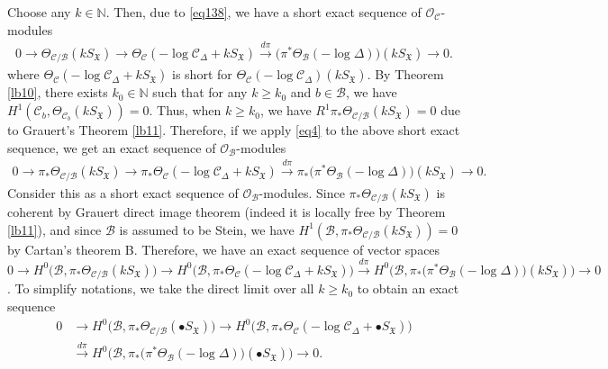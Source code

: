 \documentclass[12pt,b5paper,notitlepage]{report}
\theoremstyle{definition}
\theoremstyle{plain}
\newcommand{\fk}{\mathfrak}
\newcommand{\mc}{\mathcal}
\newcommand{\scr}{\mathscr}
\newcommand{\blt}{\bullet}
\newcommand{\Nbb}{\mathbb N}
\numberwithin{equation}{section}
\begin{document}
Choose any $k\in\Nbb$. Then, due to \eqref{eq138}, we have a short exact sequence of $\scr O_{\mc C}$-modules
\begin{align*}
0\rightarrow \Theta_{\mc C/\mc B}(kS_{\fk X})\rightarrow \Theta_{\mc C}(-\log \mc C_\Delta+kS_{\fk X})\xrightarrow{d\pi}\big(\pi^*\Theta_{\mc B}(-\log \Delta)\big)(kS_{\fk X})\rightarrow 0.
\end{align*}
where $\Theta_{\mc C}(-\log \mc C_\Delta+kS_{\fk X})$ is short for $\Theta_{\mc C}(-\log \mc C_\Delta)(kS_{\fk X})$. By Theorem \ref{lb10}, there exists $k_0\in\Nbb$ such that for any $k\geq k_0$ and $b\in \mc B$, we have $H^1(\mc C_b,\Theta_{\mc C_b}(kS_{\fk X}))=0$. Thus, when $k\geq k_0$, we have $R^1\pi_*\Theta_{\mc C/\mc B}(kS_{\fk X})=0$ due to Grauert's
Theorem \ref{lb11}. Therefore, if we apply \eqref{eq4} to the above short exact sequence, we get an exact sequence of $\scr O_{\mc B}$-modules
\begin{align*}
0\rightarrow \pi_*\Theta_{\mc C/\mc B}(k S_{\fk X})\rightarrow \pi_*\Theta_{\mc C}(-\log \mc C_\Delta+k S_{\fk X})\xrightarrow{d\pi}\pi_*\big(\pi^*\Theta_{\mc B}(-\log \Delta)\big)(k S_{\fk X})
\rightarrow 0.
\end{align*}
Consider this as a short exact sequence of $\scr O_{\mc B}$-modules. Since $\pi_*\Theta_{\mc C/\mc B}(k S_{\fk X})$ is coherent by Grauert direct image theorem (indeed it is locally free by Theorem \ref{lb11}), and since $\mc B$ is assumed to be Stein, we have $H^1(\mc B,\pi_*\Theta_{\mc C/\mc B}(k S_{\fk X}))=0$ by Cartan's theorem B. Therefore, we have an exact sequence of vector spaces $0\rightarrow H^0\big(\mc B,\pi_*\Theta_{\mc C/\mc B}(k S_{\fk X})\big)\rightarrow H^0\big(\mc B,\pi_*\Theta_{\mc C}(-\log \mc C_\Delta+k S_{\fk X})\big)\xrightarrow{d\pi}H^0\big(\mc B,\pi_*\big(\pi^*\Theta_{\mc B}(-\log \Delta)\big)(k S_{\fk X})\big)
\rightarrow 0$. To simplify notations, we take the direct limit over all $k\geq k_0$ to obtain an exact sequence 
\begin{align}
0&\rightarrow H^0\big(\mc B,\pi_*\Theta_{\mc C/\mc B}(\blt S_{\fk X})\big)\rightarrow H^0\big(\mc B,\pi_*\Theta_{\mc C}(-\log \mc C_\Delta+\blt S_{\fk X})\big)\nonumber\\
&\xrightarrow{d\pi}H^0\big(\mc B,\pi_*\big(\pi^*\Theta_{\mc B}(-\log \Delta)\big)(\blt S_{\fk X})\big)
\rightarrow 0.\label{eq151}
\end{align}
\end{document}
